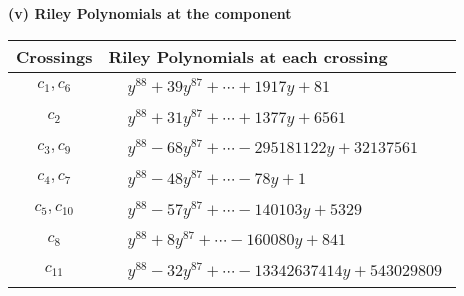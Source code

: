 \documentclass[1p]{elsarticle_modified}
\theoremstyle{definition}
\begin{document}
\flushleft \textbf{(v) Riley Polynomials at the component}\newline \\
\begin{tabular}{m{50pt}|m{274pt}}
Crossings & \hspace{64pt}Riley Polynomials at each crossing \\
\hline $$\begin{aligned}c_{1},c_{6}\end{aligned}$$&$\begin{aligned}
&y^{88}+39 y^{87}+\cdots+1917 y+81
\end{aligned}$\\
\hline $$\begin{aligned}c_{2}\end{aligned}$$&$\begin{aligned}
&y^{88}+31 y^{87}+\cdots+1377 y+6561
\end{aligned}$\\
\hline $$\begin{aligned}c_{3},c_{9}\end{aligned}$$&$\begin{aligned}
&y^{88}-68 y^{87}+\cdots-295181122 y+32137561
\end{aligned}$\\
\hline $$\begin{aligned}c_{4},c_{7}\end{aligned}$$&$\begin{aligned}
&y^{88}-48 y^{87}+\cdots-78 y+1
\end{aligned}$\\
\hline $$\begin{aligned}c_{5},c_{10}\end{aligned}$$&$\begin{aligned}
&y^{88}-57 y^{87}+\cdots-140103 y+5329
\end{aligned}$\\
\hline $$\begin{aligned}c_{8}\end{aligned}$$&$\begin{aligned}
&y^{88}+8 y^{87}+\cdots-160080 y+841
\end{aligned}$\\
\hline $$\begin{aligned}c_{11}\end{aligned}$$&$\begin{aligned}
&y^{88}-32 y^{87}+\cdots-13342637414 y+543029809
\end{aligned}$\\
\hline
\end{tabular}\\~\\
\end{document}
